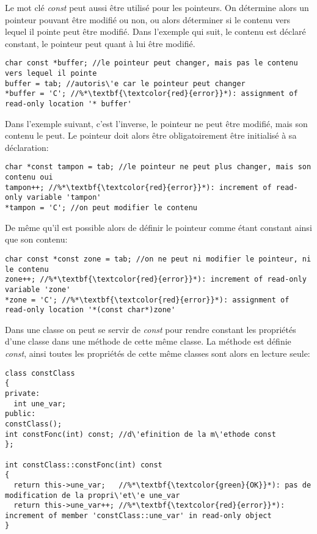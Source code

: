 \documentclass[onecolumn]{book}%
\makeatletter
\newcommand{\newdefDoubleSE}[3]{#2\index{#2@\textsc{#1}!#3}}
\makeatother
\begin{document}
Le mot cl\'e \emph{const} peut aussi \^etre utilis\'e pour les pointeurs. On d\'etermine alors un pointeur pouvant \^etre modifi\'e ou non, ou alors d\'eterminer si le contenu vers lequel il pointe peut \^etre modifi\'e.
Dans l'exemple qui suit, le contenu est d\'eclar\'e constant, le pointeur peut quant à lui \^etre modifi\'e.
\begin{framed}
\begin{lstlisting}
char const *buffer; //le pointeur peut changer, mais pas le contenu vers lequel il pointe
buffer = tab; //autoris\'e car le pointeur peut changer
*buffer = 'C'; //%*\textbf{\textcolor{red}{error}}*): assignment of read-only location '* buffer'
\end{lstlisting}
\end{framed}
Dans l'exemple suivant, c'est l'inverse, le pointeur ne peut \^etre modifi\'e, mais son contenu le peut. Le pointeur doit alors \^etre obligatoirement \^etre initialis\'e à sa d\'eclaration:
\begin{framed}
\begin{lstlisting}
char *const tampon = tab; //le pointeur ne peut plus changer, mais son contenu oui
tampon++; //%*\textbf{\textcolor{red}{error}}*): increment of read-only variable 'tampon'
*tampon = 'C'; //on peut modifier le contenu
\end{lstlisting}
\end{framed}
De m\^eme qu'il est possible alors de d\'efinir le pointeur comme \'etant constant ainsi que son contenu:
\begin{framed}
\begin{lstlisting}
char const *const zone = tab; //on ne peut ni modifier le pointeur, ni le contenu
zone++; //%*\textbf{\textcolor{red}{error}}*): increment of read-only variable 'zone'
*zone = 'C'; //%*\textbf{\textcolor{red}{error}}*): assignment of read-only location '*(const char*)zone'
\end{lstlisting}
\end{framed}

Dans une classe on peut se servir de \emph{\newdefDoubleSE{const}{const}{sur m\'ethode}} pour rendre constant les propri\'et\'es d'une classe dans une m\'ethode de cette m\^eme classe.
La m\'ethode est d\'efinie \emph{const}, ainsi toutes les propri\'et\'es de cette m\^eme classes sont alors en lecture seule:
\begin{framed}
\begin{lstlisting}
class constClass
{
private:
  int une_var;
public:
constClass();
int constFonc(int) const; //d\'efinition de la m\'ethode const
};

int constClass::constFonc(int) const
{
  return this->une_var;   //%*\textbf{\textcolor{green}{OK}}*): pas de modification de la propri\'et\'e une_var
  return this->une_var++; //%*\textbf{\textcolor{red}{error}}*): increment of member 'constClass::une_var' in read-only object
}
\end{lstlisting}
\end{framed}
\end{document}
